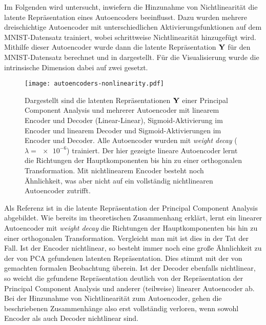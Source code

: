 Im Folgenden wird untersucht, inwiefern die Hinzunahme von Nichtlinearität die latente
Repräsentation eines Autoencoders beeinflusst. Dazu wurden mehrere dreischichtige Autoencoder mit
unterschiedlichen Aktivierungsfunktionen auf dem MNIST-Datensatz trainiert, wobei schrittweise
Nichtlinearität hinzugefügt wird. Mithilfe dieser Autoencoder wurde dann die latente Repräsentation
$\mathbf{Y}$ für den MNIST-Datensatz berechnet und in 
dargestellt. Für die Visualisierung wurde die intrinsische Dimension dabei auf zwei gesetzt.
\begin{figure}[ht]
	\centering
	\texttt{[image: autoencoders-nonlinearity.pdf]}
	\caption[Latente Repräsentationen von PCA und drei Autoencodern mit unterschiedlichen Aktivierungsfunktionen]{Dargestellt sind die latenten Repräsentationen $\mathbf{Y}$ einer \captiona Principal Component Analysis und mehrerer Autoencoder mit \captionb linearem Encoder und Decoder (Linear-Linear), \captionc Sigmoid-Aktivierung im Encoder und linearem Decoder und \captiond Sigmoid-Aktivierungen im Encoder und Decoder. Alle Autoencoder wurden mit \textit{weight decay} ($\lambda = \num{e-6}$) trainiert. Der hier gezeigte lineare Autoencoder lernt die Richtungen der Hauptkomponenten bis hin zu einer orthogonalen Transformation. Mit nichtlinearem Encoder besteht noch Ähnlichkeit, was aber nicht auf ein vollständig nichtlinearen Autoencoder zutrifft.}
	\label{fig:Autoencoder-Nichtlinearitaet}
\end{figure}
Als Referenz ist in \captiona die latente Repräsentation der Principal Component Analysis abgebildet. Wie bereits im theoretischen Zusammenhang erklärt, lernt ein linearer Autoencoder mit \textit{weight decay} die Richtungen der Hauptkomponenten bis hin zu einer orthogonalen Transformation. Vergleicht man  \captiona mit \captionb ist dies in der Tat der Fall. Ist der Encoder nichtlinear, so besteht immer noch eine große Ähnlichkeit zu der von PCA gefundenen latenten Repräsentation. Dies stimmt mit der von \textcite{Bourlard.1988} gemachten formalen Beobachtung überein. Ist der Decoder ebenfalls nichtlinear, so weicht die gefundene Repräsentation deutlich von der Repräsentation der Principal Component Analysis und anderer (teilweise) linearer Autoencoder ab. Bei der Hinzunahme von Nichtlinearität zum Autoencoder, gehen die beschriebenen Zusammenhänge also erst vollständig verloren, wenn sowohl Encoder als auch Decoder nichtlinear sind.

